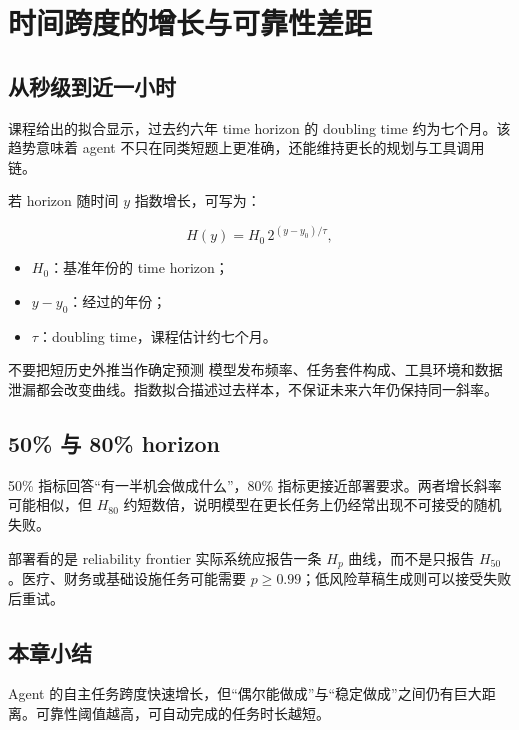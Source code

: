 \section{时间跨度的增长与可靠性差距}

\subsection{从秒级到近一小时}


课程给出的拟合显示，过去约六年 time horizon 的 doubling time 约为七个月。该趋势意味着 agent 不只在同类短题上更准确，还能维持更长的规划与工具调用链。

若 horizon 随时间 $y$ 指数增长，可写为：

$$
H(y)=H_0\,2^{(y-y_0)/\tau},
$$

\begin{itemize}
    \item $H_0$：基准年份的 time horizon；
    \item $y-y_0$：经过的年份；
    \item $\tau$：doubling time，课程估计约七个月。
\end{itemize}

\begin{warningbox}{不要把短历史外推当作确定预测}
模型发布频率、任务套件构成、工具环境和数据泄漏都会改变曲线。指数拟合描述过去样本，不保证未来六年仍保持同一斜率。
\end{warningbox}

\subsection{50\% 与 80\% horizon}



50\% 指标回答“有一半机会做成什么”，80\% 指标更接近部署要求。两者增长斜率可能相似，但 $H_{80}$ 约短数倍，说明模型在更长任务上仍经常出现不可接受的随机失败。

\begin{importantbox}{部署看的是 reliability frontier}
实际系统应报告一条 $H_p$ 曲线，而不是只报告 $H_{50}$。医疗、财务或基础设施任务可能需要 $p\ge 0.99$；低风险草稿生成则可以接受失败后重试。
\end{importantbox}

\subsection{本章小结}

Agent 的自主任务跨度快速增长，但“偶尔能做成”与“稳定做成”之间仍有巨大距离。可靠性阈值越高，可自动完成的任务时长越短。

